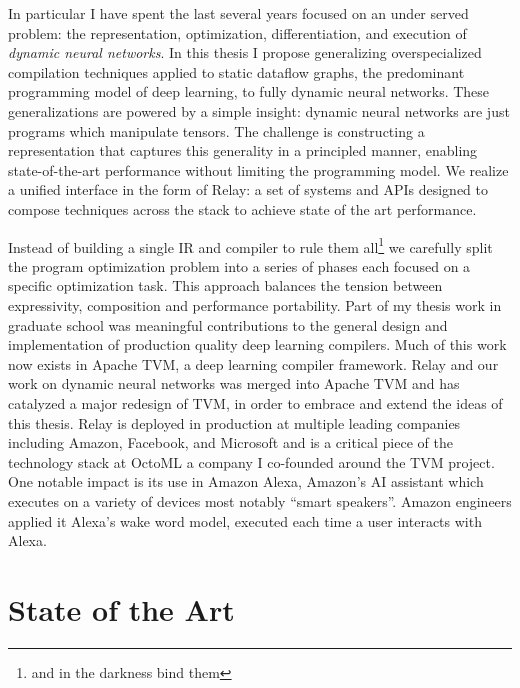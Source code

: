 
In particular I have spent the last several years focused on an under served problem:
  the representation,
  optimization,
  differentiation,
  and execution of \emph{dynamic neural networks}.
In this thesis I propose generalizing overspecialized
  compilation techniques applied to static dataflow graphs,
  the predominant programming model of deep learning,
  to fully dynamic neural networks.
These generalizations are powered by a simple insight:
  dynamic neural networks are just programs which manipulate tensors.
The challenge is constructing a representation that captures this generality
  in a principled manner, enabling state-of-the-art performance without limiting the programming model.
We realize a unified interface in the form of Relay: a set of systems and APIs designed
  to compose techniques across the stack to achieve state of the art performance.

Instead of building a single IR and compiler to rule them all\footnote{and in the darkness bind them}
  we carefully split the program optimization problem into a series of
  phases each focused on a specific optimization task.
This approach balances the tension between expressivity, composition
  and performance portability.
Part of my thesis work in graduate school
  was meaningful contributions to the general design and implementation of
  production quality deep learning compilers.
Much of this work now exists in Apache TVM, a deep learning compiler framework.
Relay and our work on dynamic neural networks was merged into Apache TVM and
  has catalyzed a major redesign of TVM, in order to embrace and extend the ideas of this thesis.
Relay is deployed in production at multiple leading companies including
  Amazon, Facebook, and Microsoft and is a critical piece of the technology stack
  at OctoML a company I co-founded around the TVM project.
One notable impact is its use in Amazon Alexa, Amazon's AI assistant
  which executes on a variety of devices most notably ``smart speakers''.
Amazon engineers applied it Alexa’s wake word model, executed each time a user interacts with
  Alexa.

\section{State of the Art}

